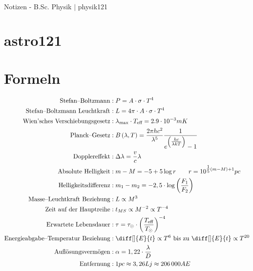 \documentclass[a4paper,12pt]{article}
\begin{document}
\thispagestyle{empty}
\hfill
\Huge
\begin{center}
        Notizen - B.Sc. Physik $|$ physik121
\end{center}
\normalsize
\hfill


\newpage

\tableofcontents


\newpage

\section*{astro121}

\section{Formeln}
\begin{align*} %
        \text{Stefan--Boltzmann}&:P=A\cdot \sigma \cdot T^4\\
        \text{Stefan--Boltzmann Leuchtkraft}&:L=4\pi\cdot A\cdot \sigma \cdot T^4\\
        \text{Wien'sches Verschiebungsgesetz}&:\lambda _{\text{max}}\cdot T_{\text{eff}}=2.9\cdot 10^{-3}mK\\
        \text{Planck--Gesetz}&:B\left(\lambda ,T\right)=\dfrac{2\pi hc ^2}{\lambda ^{5}}\dfrac{1}{e^{\left(\tfrac{hc}{\lambda kT}\right)}-1}\\
        \text{Dopplereffekt}&:\Delta \lambda =\dfrac{v}{c}\lambda\\
        \text{Absolute Helligkeit}&:m-M=-5+5\log r\qquad r=10^{\tfrac{1}{5}\left(m-M\right)+1}pc\\
        \text{Helligkeitsdifferenz}&:m_1-m_2=-2,5\cdot \log\left(\dfrac{F_1}{F_2}\right)\\
        \text{Masse--Leuchtkraft Beziehung}&:L\propto M^3\\
        \text{Zeit auf der Hauptreihe}&:t_{MS}\propto M^{-2}\propto T^{-4}\\
        \text{Erwartete Lebensdauer}&:\tau =\tau _{\odot}\cdot \left(\dfrac{T_{\text{eff} }}{T_\odot}\right)^{-4}\\
        \text{Energieabgabe--Temperatur Beziehung}&:\diff[]{E}{t}\propto T^6\text{ bis zu }\diff[]{E}{t}\propto T^{20}\\
        \text{Auflösungsvermögen}&:\alpha =1,22\cdot \dfrac{\lambda }{D}\\
        \text{Entfernung}&:1pc \approx 3,26Lj\approx 206\,000AE
\end{align*}
\end{document}
